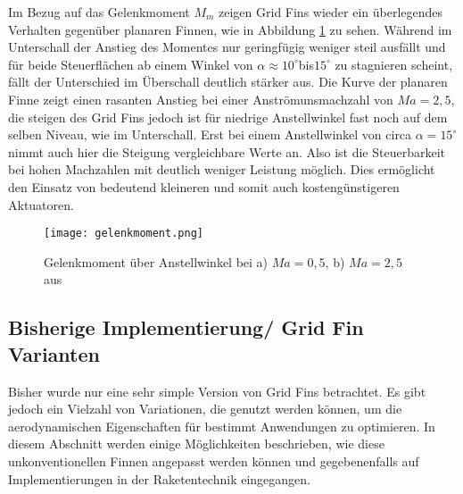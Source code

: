 Im Bezug auf das Gelenkmoment $M_m$ zeigen Grid Fins wieder ein überlegendes Verhalten gegenüber planaren Finnen, wie in Abbildung \ref{abb_Mm-AoA} zu sehen. Während im Unterschall der Anstieg des Momentes nur geringfügig weniger steil ausfällt und für beide Steuerflächen ab einem Winkel von $\alpha \approx 10^\circ$bis$15^\circ$ zu stagnieren scheint, fällt der Unterschied im Überschall deutlich stärker aus. Die Kurve der planaren Finne zeigt einen rasanten Anstieg bei einer Anströmunsmachzahl von $Ma = 2,5$, die steigen des Grid Fins jedoch ist für niedrige Anstellwinkel fast noch auf dem selben Niveau, wie im Unterschall. Erst bei einem Anstellwinkel von circa $\alpha = 15^\circ$ nimmt auch hier die Steigung vergleichbare Werte an. Also ist die Steuerbarkeit bei hohen Machzahlen mit deutlich weniger Leistung möglich. Dies ermöglicht den Einsatz von bedeutend kleineren und somit auch kostengünstigeren Aktuatoren. 
\begin{figure}[h]
	\centering
	\texttt{[image: gelenkmoment.png]}
	\caption{Gelenkmoment über Anstellwinkel bei a) \ensuremath{Ma=0,5}, b) $Ma=2,5$ aus \cite{vergleichPlanar}}
	\label{abb_Mm-AoA}
\end{figure}


\subsection{Bisherige Implementierung/ Grid Fin Varianten}
Bisher wurde nur eine sehr simple Version von Grid Fins betrachtet. Es gibt jedoch ein Vielzahl von Variationen, die genutzt werden können, um die aerodynamischen Eigenschaften für bestimmt Anwendungen zu optimieren. In diesem Abschnitt werden einige Möglichkeiten beschrieben, wie diese unkonventionellen Finnen angepasst werden können und gegebenenfalls auf Implementierungen in der Raketentechnik eingegangen.
